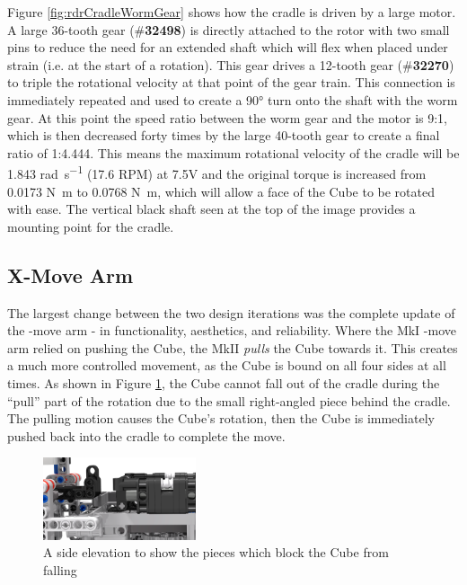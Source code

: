 \documentclass{report}
\newcommand{\tbo}[1]{\textbf{#1}}
\newcommand{\tit}[1]{\textit{#1}}
\newcommand{\legopiece}[1]{(\#\tbo{#1})}
\newcommand{\move}[1]{\uppercase{\texttt{\formatmovesnospace{#1}}}-move}
\begin{document}
	Figure \ref{fig:rdrCradleWormGear} shows how the cradle is driven by a large motor. A large 36-tooth gear \legopiece{32498} is directly attached to the rotor with two small pins to reduce the need for an extended shaft which will flex when placed under strain (i.e. at the start of a rotation). This gear drives a 12-tooth gear \legopiece{32270} to triple the rotational velocity at that point of the gear train. This connection is immediately repeated and used to create a \ang{90} turn onto the shaft with the worm gear. At this point the speed ratio between the worm gear and the motor is 9:1, which is then decreased forty times by the large 40-tooth gear to create a final ratio of 1:4.444. This means the maximum rotational velocity of the cradle will be 1.843 \si{\radian\per\second} (17.6 RPM) at 7.5\si{\volt} and the original torque is increased from 0.0173 \si{\newton\metre} to 0.0768 \si{\newton\metre}, which will allow a face of the Cube to be rotated with ease. The vertical black shaft seen at the top of the image provides a mounting point for the cradle.
	
	\subsection{X-Move Arm}
    
    The largest change between the two design iterations was the complete update of the \move{x} arm - in functionality, aesthetics, and reliability. Where the MkI \move{x} arm relied on pushing the Cube, the MkII \tit{pulls} the Cube towards it. This creates a much more controlled movement, as the Cube is bound on all four sides at all times. As shown in Figure \ref{fig:rdrXMoveBlock}, the Cube cannot fall out of the cradle during the \enquote{pull} part of the rotation due to the small right-angled piece behind the cradle. The pulling motion causes the Cube's rotation, then the Cube is immediately pushed back into the cradle to complete the move.
   	
	\begin{figure}[H]
		\centering
		\includegraphics[width=0.4\textwidth]{Resources/Images/rdrXMoveBlock.png}
		\caption{A side elevation to show the pieces which block the Cube from falling}
		\label{fig:rdrXMoveBlock}
   	\end{figure}
   
\end{document}
